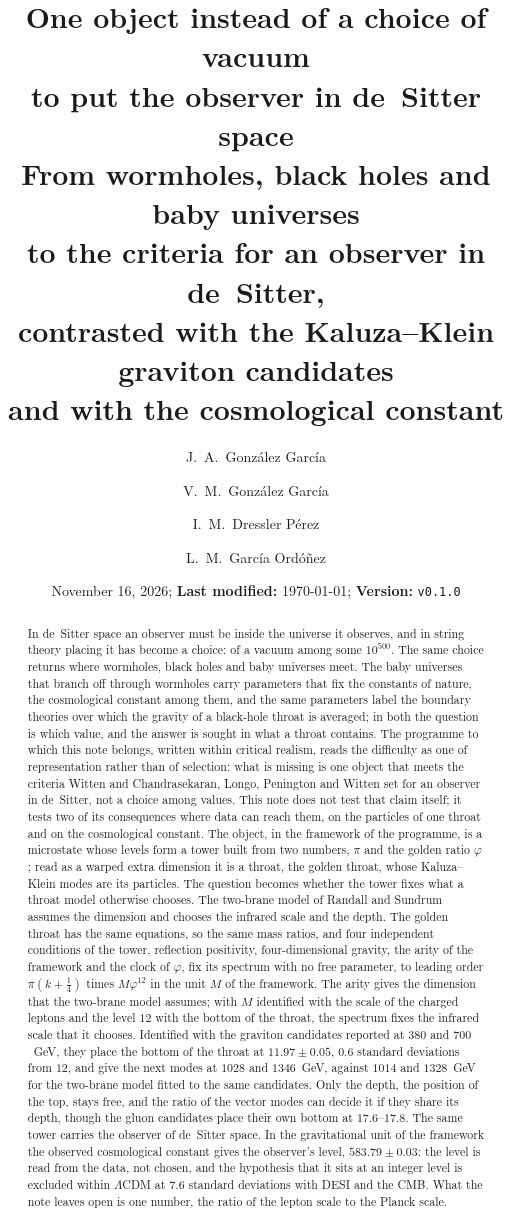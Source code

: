 \documentclass[11pt,reqno]{amsart}
\title[One object instead of a choice of vacuum]{\textbf{One object instead of a choice of vacuum\\to put the observer in de~Sitter space}\\[2pt]
From wormholes, black holes and baby universes\\to the criteria for an observer in de~Sitter,\\contrasted with the Kaluza--Klein graviton candidates\\and with the cosmological constant}
\author[J. A. González García et al.]{J.~A.~Gonz\'alez Garc\'ia}
\author[]{V.~M.~Gonz\'alez Garc\'ia}
\author[]{I.~M.~Dressler P\'erez}
\author[]{L.~M.~Garc\'ia Ord\'o\~nez}
\date{November 16, 2026; \textbf{Last modified:} \today; \textbf{Version:} \texttt{v0.1.0}}
\newcommand{\golden}{\varphi}
\numberwithin{equation}{section}
\theoremstyle{remark}
\begin{document}
\begin{abstract}
In de~Sitter space an observer must be inside the universe it observes, and in string theory placing
it has become a choice: of a vacuum among some $10^{500}$. The same choice returns where wormholes,
black holes and baby universes meet. The baby universes that branch off through wormholes carry
parameters that fix the constants of nature, the cosmological constant among them, and the same
parameters label the boundary theories over which the gravity of a black-hole throat is averaged; in
both the question is which value, and the answer is sought in what a throat contains. The programme
to which this note belongs, written within critical realism, reads the difficulty as one of
representation rather than of selection: what is missing is one object that meets the criteria
Witten and Chandrasekaran, Longo, Penington and Witten set for an observer in de~Sitter, not a
choice among values. This note does not test that claim itself; it tests two of its consequences
where data can reach them, on the particles of one throat and on the cosmological constant. The
object, in the framework of the programme, is a microstate whose levels form a tower built from two
numbers, $\pi$ and the golden ratio $\golden$; read as a warped extra dimension it is a throat, the
golden throat, whose Kaluza--Klein modes are its particles. The question becomes whether the tower
fixes what a throat model otherwise chooses. The two-brane model of Randall and Sundrum assumes the
dimension and chooses the infrared scale and the depth. The golden throat has the same equations, so
the same mass ratios, and four independent conditions of the tower, reflection positivity,
four-dimensional gravity, the arity of the framework and the clock of $\golden$, fix its spectrum
with no free parameter, to leading order $\pi(k+\tfrac14)$ times $M\golden^{12}$ in the unit $M$ of
the framework. The arity gives the dimension that the two-brane model assumes; with $M$ identified
with the scale of the charged leptons and the level $12$ with the bottom of the throat, the spectrum
fixes the infrared scale that it chooses. Identified with the graviton candidates reported at $380$
and $700$~GeV, they place the bottom of the throat at $11.97\pm0.05$, $0.6$ standard deviations from
$12$, and give the next modes at $1028$ and $1346$~GeV, against $1014$ and $1328$~GeV for the
two-brane model fitted to the same candidates. Only the depth, the position of the top, stays free,
and the ratio of the vector modes can decide it if they share its depth, though the gluon candidates place their own bottom at $17.6$--$17.8$. The same tower carries the observer of de~Sitter
space. In the gravitational unit of the framework the observed cosmological constant gives the
observer's level, $583.79\pm0.03$: the level is read from the data, not chosen, and the hypothesis
that it sits at an integer level is excluded within $\Lambda$CDM at $7.6$ standard deviations with DESI and the CMB. What
the note leaves open is one number, the ratio of the lepton scale to the Planck scale.
\end{abstract}
\end{document}
